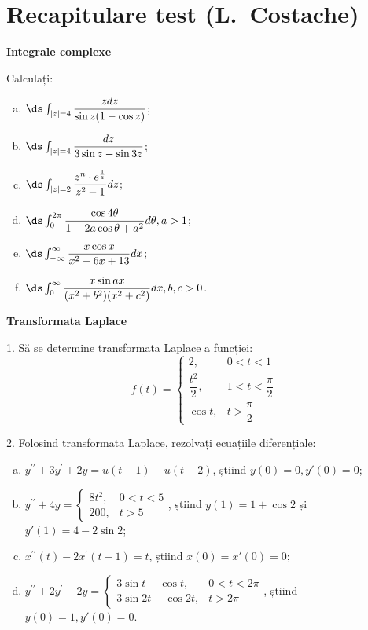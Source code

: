 
\chapter{Recapitulare test (L.\ Costache)}

\indent\indent \textbf{Integrale complexe}

Calculați:

\begin{enumerate}[(a)]
    \item $ \ds\int_{|z| = 4} \dfrac{zdz}{\sin z(1 - \cos z)} $;
    \item $ \ds\int_{|z| = 4} \dfrac{dz}{3 \sin z - \sin 3z} $;
    \item $ \ds\int_{|z| = 2} \dfrac{z^n \cdot e^{\frac{1}{z}}}{z^2 - 1} dz $;
    \item $ \ds\int_0^{2\pi} \dfrac{\cos 4\theta}{1 - 2a \cos \theta + a^2} d\theta, a > 1 $;
    \item $ \ds\int_{-\infty}^{\infty} \dfrac{x \cos x}{x^2 - 6x + 13} dx $;
    \item $ \ds\int_0^\infty \dfrac{x \sin ax}{(x^2 + b^2)(x^2 + c^2)} dx, b, c > 0 $.
\end{enumerate}

\vspace{0.3cm}

\textbf{Transformata Laplace}

1. Să se determine transformata Laplace a funcției:
\[
    f(t) = \begin{cases}
        2, & 0 < t < 1 \\
        \dfrac{t^2}{2}, & 1 < t < \dfrac{\pi}{2} \\
        \cos t, & t > \dfrac{\pi}{2}
    \end{cases}
\]

\vspace{0.3cm}

2. Folosind transformata Laplace, rezolvați ecuațiile diferențiale:

\begin{enumerate}[(a)]
    \item $ y^{\prime\prime} + 3y^\prime + 2y = u(t - 1) - u(t - 2) $, știind $ y(0) = 0, y'(0) = 0 $;
    \item $ y^{\prime\prime} + 4y = \begin{cases} 8t^2, & 0 < t < 5 \\ 200, & t > 5 \end{cases} $,
    știind $ y(1) = 1 + \cos 2 $ și $ y'(1) = 4 - 2 \sin 2 $;
    \item $ x^{\prime\prime}(t) - 2x^\prime(t - 1) = t $, știind $ x(0) = x'(0) = 0 $;
    \item $ y^{\prime\prime} + 2 y^\prime - 2y = %
    \begin{cases}
        3 \sin t - \cos t, & 0 < t < 2\pi \\
        3 \sin 2t - \cos 2t, & t > 2 \pi
    \end{cases} $, știind $ y(0) = 1, y'(0) = 0 $.
\end{enumerate}

